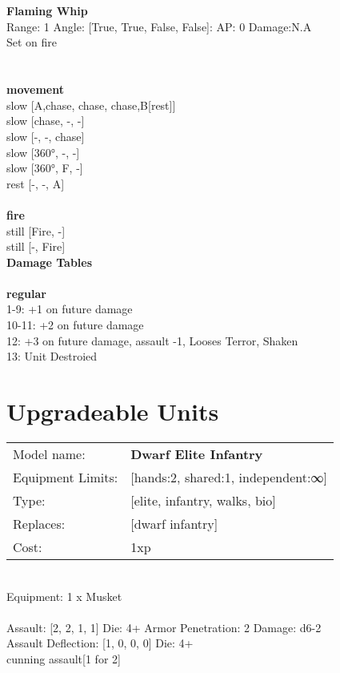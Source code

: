 \ \\

\ \\
{\bf Flaming Whip } \\



Range: 1  Angle: [True, True, False, False]: AP: 0 Damage:N.A \\
Set on fire\\ 




 
\ \\



\ \\ {\bf movement } \\
slow [A,chase, chase, chase,B[rest]] \\
slow [chase, -, -] \\
slow [-, -, chase] \\
slow [360°, -, -] \\
slow [360°, F, -] \\
rest [-, -, A] \\
\ \\ {\bf fire } \\
still [Fire, -] \\
still [-, Fire] \\


{\bf Damage Tables} \\
\ \\ {\bf regular } \\
1-9: +1 on future damage \\
10-11: +2 on future damage \\
12: +3 on future damage, assault -1, Looses Terror, Shaken \\
13: Unit Destroied \\










\pagebreak\section{Upgradeable Units}\noindent
\begin{tabular}{ll}
Model name: &{\bf Dwarf Elite Infantry } \\
Equipment Limits: &[hands:2, shared:1, independent:∞] \\
Type: &[elite, infantry, walks, bio] \\
Replaces: &[dwarf infantry] \\
Cost: & 1xp\\
\end{tabular}
\ \\
Equipment: 1 x Musket \\
\ \\
Assault: [2, 2, 1, 1] Die: 4+ Armor Penetration: 2 Damage: d6-2 \\
Assault Deflection: [1, 0, 0, 0] Die: 4+\\
\indent cunning assault[1 for 2]\\ 
 
